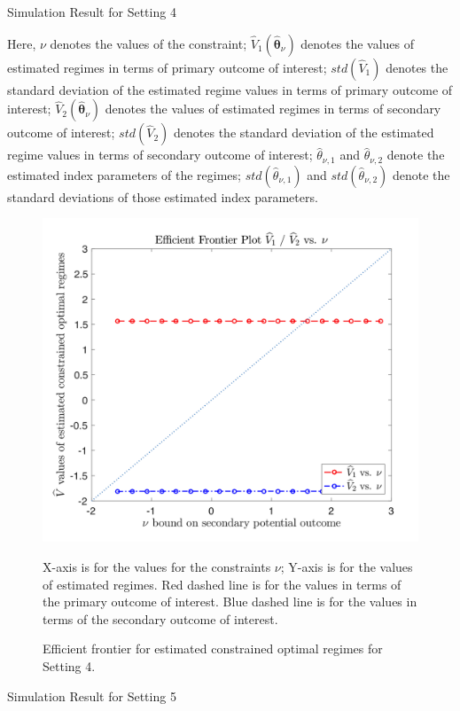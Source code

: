 \documentclass{article}
\newcommand{\wh}{\widehat}
\newcommand{\bs}{ \boldsymbol}
\begin{document}
\begin{appendices}
\begin{table}[!htbp]
	\caption {Simulation Result for Setting 4}
	\centering
	{\tt
		
	}
	\justify
	Here, $\nu$ denotes the values of the constraint; $\wh{V}_1(\wh{\bs{\theta}}_{\nu})$ denotes the values of estimated regimes in terms of primary outcome of interest; $std(\wh{V}_1)$ denotes the standard deviation of the estimated regime values in terms of primary outcome of interest; $\wh{V}_2(\wh{\bs{\theta}}_{\nu})$ denotes the values of estimated regimes in terms of secondary outcome of interest; $std(\wh{V}_2)$ denotes the standard deviation of the estimated regime values in terms of secondary outcome of interest; $\wh{\theta}_{\nu,1}$ and $\wh{\theta}_{\nu,2}$ denote the estimated index parameters of the regimes; $std(\wh{\theta}_{\nu,1})$ and $std(\wh{\theta}_{\nu,2})$ denote the standard deviations of those estimated index parameters.	
\end{table} 
\begin{figure}[!htb]
	\centering
	\includegraphics[width=.9\linewidth]{./figs/efficient_plot4.png}
	\caption{Efficient frontier for estimated constrained optimal regimes for Setting 4.}
	\label{fig:4}
	\justify
X-axis is for the values for the constraints $\nu$; Y-axis is for the values of estimated regimes. Red dashed line is for the values in terms of the primary outcome of interest. Blue dashed line is for the values in terms of the secondary outcome of interest.
\end{figure}
\begin{table}[!htbp]
	\caption {Simulation Result for Setting 5}
	\centering
	{\tt
		
	}
	\justify

\end{table}
\end{appendices}
\end{document}
